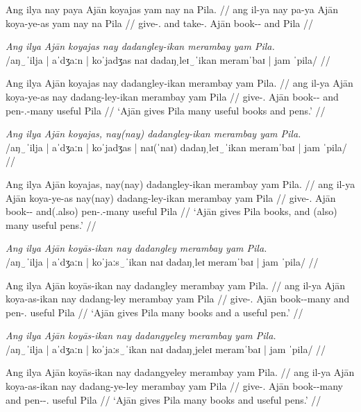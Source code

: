\documentclass[12pt,a4paper]{scrartcl}
\newcommand{\PargI}{{\Parg}.{\Inan}}
\newcommand{\TsgM}{{\Tsg}.{\M}}
\begin{document}
\a\ljudge*\begingl
\gla Ang ilya nay paya Ajān koyajas yam nay na Pila. //
\glb ang il-ya nay pa-ya Ajān koya-ye-as yam nay na Pila //
\glc \AgtT{} give-\TsgM{} and take-\TsgM{} Ajān book-\Pl{}-\Parg{} \Dat{} and \Gen{} Pila //
\endgl

\xe

\ex\begingl
\glpreamble \textit{Ang ilya Ajān koyajas nay dadangley-ikan merambay yam Pila.}\\
	/aŋ‿ˈilja | aˈdʒaːn | koˈjadʒas naɪ dadaŋˌleɪ‿ˈikan meramˈbaɪ | jam ˈpila/ //

\gla Ang ilya Ajān koyajas nay dadangley-ikan merambay yam Pila. //
\glb ang il-ya Ajān koya-ye-as nay dadang-ley-ikan merambay yam Pila //
\glc \AgtT{} give-\TsgM{} Ajān book-\Pl{}-\Parg{} and pen-\PargI{}-many useful \Dat{} Pila //
\glft `Ajān gives Pila many useful books and pens.' //
\endgl\xe

\ex\begingl
\glpreamble \textit{Ang ilya Ajān koyajas, nay(nay) dadangley-ikan merambay yam Pila.}\\
	/aŋ‿ˈilja | aˈdʒaːn | koˈjadʒas | naɪ(ˈnaɪ) dadaŋˌleɪ‿ˈikan meramˈbaɪ | jam ˈpila/ //

\gla Ang ilya Ajān koyajas, nay(nay) dadangley-ikan merambay yam Pila. //
\glb ang il-ya Ajān koya-ye-as nay(nay) dadang-ley-ikan merambay yam Pila //
\glc \AgtT{} give-\TsgM{} Ajān book-\Pl{}-\Parg{} and(.also) pen-\PargI{}-many useful \Dat{} Pila //
\glft `Ajān gives Pila books, and (also) many useful pens.' //
\endgl\xe

\ex\begingl
\glpreamble \textit{Ang ilya Ajān koyās-ikan nay dadangley merambay yam Pila.}\\
	/aŋ‿ˈilja | aˈdʒaːn | koˈjaːs‿ˈikan naɪ dadaŋˌleɪ meramˈbaɪ | jam ˈpila/ //

\gla Ang ilya Ajān koyās-ikan nay dadangley merambay yam Pila. //
\glb ang il-ya Ajān koya-as-ikan nay dadang-ley merambay yam Pila //
\glc \AgtT{} give-\TsgM{} Ajān book-\Parg{}-many and pen-\PargI{} useful \Dat{} Pila //
\glft `Ajān gives Pila many books and a useful pen.' //
\endgl\xe

\ex\begingl
\glpreamble \textit{Ang ilya Ajān koyās-ikan nay dadangyeley merambay yam Pila.}\\
	/aŋ‿ˈilja | aˈdʒaːn | koˈjaːs‿ˈikan naɪ dadaŋˌjeleɪ meramˈbaɪ | jam ˈpila/ //

\gla Ang ilya Ajān koyās-ikan nay dadangyeley merambay yam Pila. //
\glb ang il-ya Ajān koya-as-ikan nay dadang-ye-ley merambay yam Pila //
\glc \AgtT{} give-\TsgM{} Ajān book-\Parg{}-many and pen-\Pl{}-\PargI{} useful \Dat{} Pila //
\glft `Ajān gives Pila many books and useful pens.' //
\endgl\xe
\end{document}
